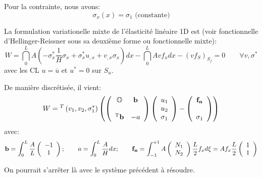 \medskip
Pour la contrainte, nous avons:
\begin{equation} \sigma_x(x)=\sigma_1 \text{ (constante)} \end{equation}

\medskip
La formulation variationelle mixte de l'élasticité linéaire 1D est (voir fonctionnelle
d'Hellinger-Reissner sous sa deuxième forme ou fonctionnelle mixte):
\begin{equation}
W=\dint_0^L A\left(-\sigma_x^*\frac1H\sigma_x+\sigma_x^*u_{,x}+v_{,x}\sigma_x\right) dx
-\dint_0^L Avf_x dx - (v f_S)_{S_f} = 0\qquad \forall v,\sigma^*
\end{equation}
avec les CL $u=\overline{u}$ et $u^*=0$ sur $S_u$.

\medskip
De manière discrétisée, il vient:
\begin{equation}
W = {}^T\left( v_1, v_2, \sigma_1^*\right)\left(
\left( \begin{array}{cc} \mathbb{O} & \mathbf{b}\\ ~\\ {}^\mathrm{T}\mathbf{b} & -a \end{array}\right)
\left( \begin{array}{c} u_1\\u_2\\ \sigma_1 \end{array}\right)
- \left( \begin{array}{c} \mathbf{f_n}\\~\\ \sigma_1 \end{array}\right)
\right)\end{equation}
avec:
\begin{equation}
\mathbf{b}=\displaystyle\int_0^L \frac{A}L \left( \begin{array}{c} -1\\1\end{array}\right); \qquad
a=\displaystyle\int_0^L \frac{A}H dx; \qquad
\mathbf{f_n} = \displaystyle\int_{-1}^{+1} A \left( \begin{array}{c} N_1\\N_2 \end{array}\right) \frac{L}2 f_x d\xi =
 A f_x \frac{L}2  \left( \begin{array}{c} 1\\1 \end{array}\right)
\end{equation}

\medskip
On pourrait s'arrêter là avec le système précédent à résoudre.

